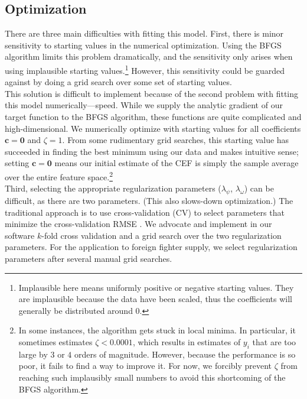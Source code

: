 \documentclass[12pt]{article}
\newcommand{\bc}{\mathbf{c}}
\begin{document}
\subsection{Optimization}	 
	
There are three main difficulties with fitting this model. First, there is minor sensitivity to starting values in the numerical optimization. Using the BFGS algorithm limits this problem dramatically, and the sensitivity only arises when using implausible starting values.\footnote{Implausible here means uniformly positive or negative starting values. They are implausible because the data have been scaled, thus the coefficients will generally be distributed around $0$.} However, this sensitivity could be guarded against by doing a grid search over some set of starting values. \\

This solution is difficult to implement because of the second problem with fitting this model numerically---speed. While we supply the analytic gradient of our target function to the BFGS algorithm, these functions are quite complicated and high-dimensional. We numerically optimize with starting values for all coefficients $\bc = \mathbf{0}$ and $\zeta = 1$. From some rudimentary grid searches, this starting value has succeeded in finding the best minimum using our data and makes intuitive sense; setting $\bc = \mathbf{0}$ means our initial estimate of the CEF is simply the sample average over the entire feature space.\footnote{In some instances, the algorithm gets stuck in local minima. In particular, it sometimes estimates $\zeta < 0.0001$, which results in estimates of $y_i$ that are too large by $3$ or $4$ orders of magnitude. However, because the performance is so poor, it fails to find a way to improve it. For now, we forcibly prevent $\zeta$ from reaching such implausibly small numbers to avoid this shortcoming of the BFGS algorithm.}	\\

Third, selecting the appropriate regularization parameters ($\lambda_\psi$, $\lambda_\omega$) can be difficult, as there are two parameters. (This also slows-down optimization.) The traditional approach is to use cross-validation (CV) \citep{Stone1974} to select parameters that minimize the cross-validation RMSE \citep{Friedman2001}. We advocate and implement in our software $k$-fold cross validation and a grid search over the two regularization parameters. For the application to foreign fighter supply, we select regularization parameters after several manual grid searches.
\end{document}
